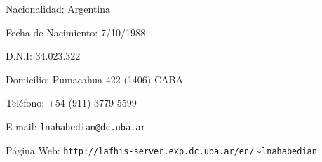 \item Nacionalidad: Argentina

\item Fecha de Nacimiento: 7/10/1988

\item D.N.I: 34.023.322

\item Domicilio: Pumacahua 422 (1406) CABA

\item Tel\'efono: +54 (911) 3779 5599

\item E-mail: {\tt lnahabedian@dc.uba.ar}

\item P\'agina Web: {\tt http://lafhis-server.exp.dc.uba.ar/en/$\sim$lnahabedian}
